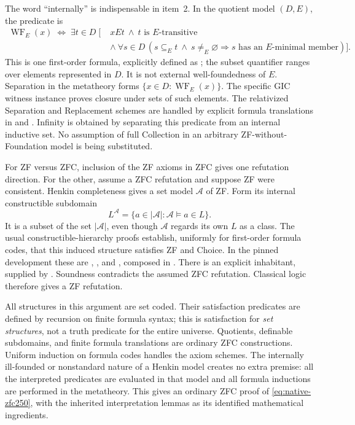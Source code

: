 The word ``internally'' is indispensable in item~2.  In the
quotient model $(D,E)$, the predicate is
\[
\begin{split}
 \operatorname{WF}_E(x)\;\Longleftrightarrow\;
 \exists t\in D\;[\;&xEt\ \wedge\ t\text{ is }E\text{-transitive}\\
 &\wedge\ \forall s\in D\,
   (s\subseteq_E t\ \wedge\ s\ne_E\varnothing
      \Rightarrow s\text{ has an }E\text{-minimal member})].
\end{split}
\]
This is one first-order formula, explicitly defined as
; the subset quantifier ranges
over elements represented in $D$.  It is not external
well-foundedness of $E$.  Separation in the metatheory forms
$\{x\in D:\operatorname{WF}_E(x)\}$.  The specific GIC witness
instance proves closure under sets of such elements.  The
relativized Separation and Replacement schemes are handled by
explicit formula translations in 
and .  Infinity is
obtained by separating this predicate from an internal
inductive set.  No assumption of full Collection in an
arbitrary ZF-without-Foundation model is being substituted.

For ZF versus ZFC, inclusion of the ZF axioms in ZFC gives one
refutation direction.  For the other, assume a ZFC refutation
and suppose ZF were consistent.  Henkin completeness gives
a set model $\mathcal A$ of ZF.  Form its internal constructible
subdomain
\[
 L^{\mathcal A}=\{a\in |\mathcal A|:
                       \mathcal A\models a\in L\}.
\]
It is a subset of the set $|\mathcal A|$, even though
$\mathcal A$ regards its own $L$ as a class.  The usual
constructible-hierarchy proofs establish, uniformly for
first-order formula codes, that this induced structure
satisfies ZF and Choice.  In the pinned development these are
,
, and
, composed in
.
There is an explicit inhabitant, supplied by
.  Soundness contradicts the
assumed ZFC refutation.  Classical logic therefore gives a ZF
refutation.

All structures in this argument are set coded.  Their
satisfaction predicates are defined by recursion on finite
formula syntax; this is satisfaction for \emph{set structures},
not a truth predicate for the entire universe.  Quotients,
definable subdomains, and finite formula translations are
ordinary ZFC constructions.  Uniform induction on formula
codes handles the axiom schemes.  The internally ill-founded
or nonstandard nature of a Henkin model creates no extra
premise: all the interpreted predicates are evaluated in
that model and all formula inductions are performed in the
metatheory.  This gives an ordinary ZFC proof of
\eqref{eq:native-zfc250}, with the inherited interpretation
lemmas as its identified mathematical ingredients.


